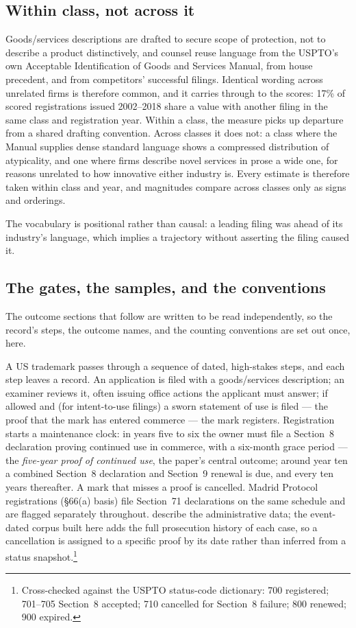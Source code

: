 \subsection{Within class, not across it}

Goods/services descriptions are drafted to secure scope of protection, not to
describe a product distinctively, and counsel reuse language from the USPTO's
own Acceptable Identification of Goods and Services Manual, from house
precedent, and from competitors' successful filings. Identical wording across
unrelated firms is therefore common, and it carries through to the scores:
17\% of scored registrations issued 2002--2018 share a value with another
filing in the same class and registration year. Within a class, the measure picks up departure from a shared
drafting convention. Across classes it does not: a class where the Manual
supplies dense standard language shows a compressed distribution of
atypicality, and one where firms describe novel services in prose a wide one,
for reasons unrelated to how innovative either industry is. Every estimate is
therefore taken within class and year, and magnitudes compare across classes
only as signs and orderings.

The vocabulary is positional rather than causal: a leading filing was
ahead of its industry's language, which implies a trajectory without
asserting the filing caused it.

\subsection{The gates, the samples, and the conventions}\label{sec:gates}

The outcome sections that follow are written to be read independently, so
the record's steps, the outcome names, and the counting conventions are
set out once, here.

A US trademark passes through a sequence of dated, high-stakes steps, and
each step leaves a record. An application is filed with a goods/services
description; an examiner reviews it, often issuing office actions the
applicant must answer; if allowed and (for intent-to-use filings) a sworn
statement of use is filed --- the proof that the mark has entered commerce
--- the mark registers. Registration starts a maintenance clock: in years
five to six the owner must file a Section~8 declaration proving continued
use in commerce, with a six-month grace period --- the \emph{five-year
proof of continued use}, the paper's central outcome; around year ten a
combined Section~8 declaration and Section~9 renewal is due, and every ten
years thereafter. A mark that misses a proof is cancelled. Madrid Protocol
registrations (\S66(a) basis) file Section~71 declarations on the same
schedule and are flagged separately throughout. \citet{Graham2013}
describe the administrative data; the event-dated corpus built here adds
the full prosecution history of each case, so a cancellation is assigned
to a specific proof by its date rather than inferred from a status
snapshot.\footnote{Cross-checked against the USPTO status-code dictionary:
700 registered; 701--705 Section~8 accepted; 710 cancelled for Section~8
failure; 800 renewed; 900 expired.}

